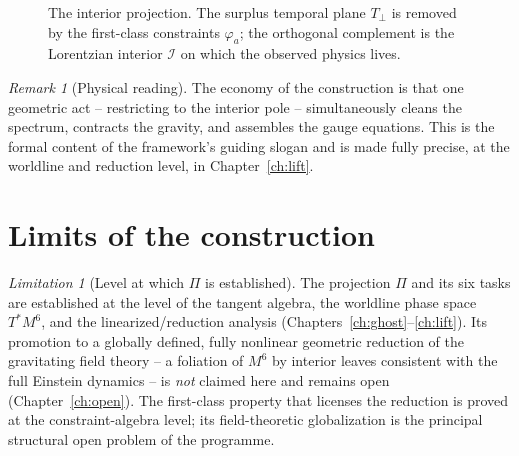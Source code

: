 \documentclass[11pt,oneside]{book}
\newcommand{\Wh}{\hat{W}}                         %
\theoremstyle{plain}
\theoremstyle{definition}
\theoremstyle{remark}
\newtheorem{remark}[theorem]{Remark}
\newtheorem{limitation}[theorem]{Limitation}
\begin{document}
\begin{figure}[t]
\centering
{}
\caption{The interior projection. The surplus temporal plane $T_\perp$ is removed
by the first-class constraints $\varphi_a$; the orthogonal complement is the
Lorentzian interior $\mathcal I$ on which the observed physics lives.}
\label{fig:projection}
\end{figure}

\begin{remark}[Physical reading]
The economy of the construction is that one geometric act -- restricting to the
interior pole -- simultaneously cleans the spectrum, contracts the gravity, and
assembles the gauge equations. This is the formal content of the framework's
guiding slogan and is made fully precise, at the worldline and reduction level, in
Chapter~\ref{ch:lift}.
\end{remark}

\section{Limits of the construction}
\label{sec:manifold-limits}

\begin{limitation}[Level at which $\Pi$ is established]
\label{lim:Pi-level}
The projection $\Pi$ and its six tasks are established at the level of the tangent
algebra, the worldline phase space $T^*M^6$, and the linearized/reduction analysis
(Chapters~\ref{ch:ghost}--\ref{ch:lift}). Its promotion to a globally defined,
fully nonlinear geometric reduction of the gravitating field theory -- a foliation
of $M^6$ by interior leaves consistent with the full Einstein dynamics -- is
\emph{not} claimed here and remains open (Chapter~\ref{ch:open}). The first-class
property that licenses the reduction is proved at the constraint-algebra level; its
field-theoretic globalization is the principal structural open problem of the
programme.
\end{limitation}
\end{document}
